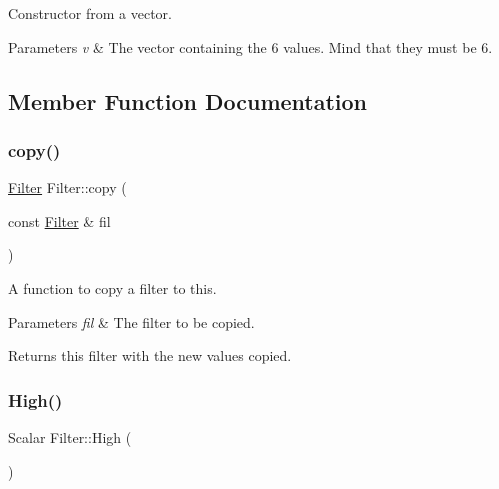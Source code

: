 Constructor from a vector. 


\begin{DoxyParams}{Parameters}
{\em v} & The vector containing the 6 values. Mind that they must be 6. \\
\hline
\end{DoxyParams}


\subsection{Member Function Documentation}
\mbox{\label{class_filter_a54ac470a139c2389861241cdb3cd8cc9}} 
\subsubsection{\texorpdfstring{copy()}{copy()}}
{\footnotesize\ttfamily \mbox{\hyperlink{class_filter}{Filter}} Filter\+::copy (\begin{DoxyParamCaption}\item[{const \mbox{\hyperlink{class_filter}{Filter}} \&}]{fil }\end{DoxyParamCaption})\hspace{0.3cm}{\ttfamily [inline]}}



A function to copy a filter to this. 


\begin{DoxyParams}{Parameters}
{\em fil} & The filter to be copied. \\
\hline
\end{DoxyParams}
\begin{DoxyReturn}{Returns}
this filter with the new values copied. 
\end{DoxyReturn}
\mbox{\label{class_filter_a448a83071e9f33c39ba09ac139a8af31}} 
\subsubsection{\texorpdfstring{High()}{High()}}
{\footnotesize\ttfamily Scalar Filter\+::\+High (\begin{DoxyParamCaption}{ }\end{DoxyParamCaption})\hspace{0.3cm}{\ttfamily [inline]}}



